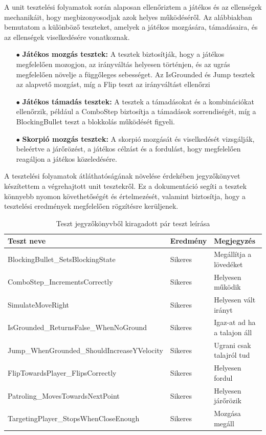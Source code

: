 \documentclass[
]{thesis-ekf}
\theoremstyle{definition}
\theoremstyle{remark}
\begin{document}
A unit tesztelési folyamatok során alaposan ellenőriztem a játékos és az ellenségek mechanikáit, hogy megbizonyosodjak azok helyes működéséről. Az alábbiakban bemutatom a különböző teszteket, amelyek a játékos mozgására, támadásaira, és az ellenségek viselkedésére vonatkoznak.
\begin{itemize}
	\item[$\bullet$] \textbf{Játékos mozgás tesztek:} A tesztek biztosítják, hogy a játékos megfelelően mozogjon, az irányváltás helyesen történjen, és az ugrás megfelelően növelje a függőleges sebességet. Az IsGrounded és Jump tesztek az alapvető mozgást, míg a Flip teszt az irányváltást ellenőrzi
	\item[$\bullet$]\textbf{Játékos támadás tesztek:} A tesztek a támadásokat és a kombinációkat ellenőrzik, például a ComboStep biztosítja a támadások sorrendiségét, míg a BlockingBullet teszt a blokkolás működését figyeli.
	\item[$\bullet$]\textbf{Skorpió mozgás tesztek:} A skorpió mozgását és viselkedését vizsgálják, beleértve a járőrözést, a játékos célzást és a fordulást, hogy megfelelően reagáljon a játékos közeledésére.
\end{itemize}
A tesztelési folyamatok átláthatóságának növelése érdekében jegyzőkönyvet készítettem a végrehajtott unit tesztekről. Ez a dokumentáció segíti a tesztek könnyebb nyomon követhetőségét és értelmezését, valamint biztosítja, hogy a tesztelési eredmények megfelelően rögzítésre kerüljenek.
\begin{table}[h!]
\centering
\begin{tabular}{|p{9cm}|p{2cm}|p{5cm}|}
	\hline
	\textbf{Teszt neve} & \textbf{Eredmény} & \textbf{Megjegyzés}\\
	\hline
	BlockingBullet\_SetsBlockingState& Sikeres & Megállítja a lövedéket\\
	\hline
	ComboStep\_IncrementsCorrectly& Sikeres& Helyesen működik\\
	\hline
	SimulateMoveRight& Sikeres& Helyesen vált irányt\\
	\hline
	IsGrounded\_ReturnsFalse\_WhenNoGround& Sikeres&  Igaz-at ad ha a talajon áll\\
	\hline
	 Jump\_WhenGrounded\_ShouldIncreaseYVelocity&Sikeres & Ugrani csak talajról tud\\
	\hline
	FlipTowardsPlayer\_FlipsCorrectly&Sikeres & Helyesen fordul\\
	\hline
	Patroling\_MovesTowardsNextPoint&Sikeres & Helyesen járőrözik\\
	\hline
	TargetingPlayer\_StopsWhenCloseEnough& Sikeres& Mozgása megáll\\
	\hline
\end{tabular}
\caption{Teszt jegyzőkönyvből kiragadott pár teszt leírása}
\end{table}
\end{document}
